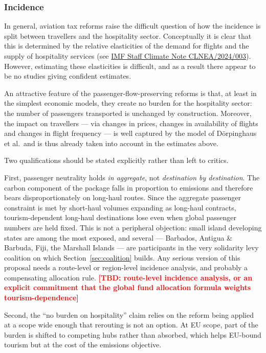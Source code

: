 \documentclass[11pt]{article}
\newcommand{\tbd}[1]{\textcolor{red}{\textbf{[TBD: #1]}}}
\begin{document}
\subsubsection{Incidence}
\label{subsec:incidence}

In general, aviation tax reforms raise the difficult question of how the
incidence is split between travellers and the hospitality sector.
Conceptually it is clear that this is determined by the relative elasticities of
the demand for flights and the supply of hospitality services (see
\href{https://meetings.imf.org/en/-/media/files/publications/staff-climate-notes/2024/english/clnea2024003.pdf}{IMF
Staff Climate Note CLNEA/2024/003}). However, estimating these elasticities is
difficult, and as a result there appear to be no studies giving confident
estimates.

An attractive feature of the passenger-flow-preserving reforms is that, at least
in the simplest economic models, they create no burden for the hospitality
sector: the number of passengers transported is unchanged by construction.
Moreover, the impact on travellers --- via changes in prices, changes in
availability of flights and changes in flight frequency --- is well captured by
the model of Dörpinghaus et al.\ and is thus already taken into account in the
estimates above.

Two qualifications should be stated explicitly rather than left to critics.

First, passenger neutrality holds \emph{in aggregate}, not
\emph{destination by destination}. The carbon component of the package falls in
proportion to emissions and therefore bears disproportionately on long-haul
routes. Since the aggregate passenger constraint is met by short-haul volumes
expanding as long-haul contracts, tourism-dependent long-haul destinations lose
even when global passenger numbers are held fixed. This is not a peripheral
objection: small island developing states are among the most exposed, and
several --- Barbados, Antigua \& Barbuda, Fiji, the Marshall Islands --- are
participants in the very solidarity levy coalition on which
Section~\ref{sec:coalition} builds. Any serious version of this proposal needs a
route-level or region-level incidence analysis, and probably a compensating
allocation rule. \tbd{route-level incidence analysis, or an explicit commitment
that the global fund allocation formula weights tourism-dependence}

Second, the ``no burden on hospitality'' claim relies on the reform being
applied at a scope wide enough that rerouting is not an option. At EU scope,
part of the burden is shifted to competing hubs rather than absorbed, which
helps EU-bound tourism but at the cost of the emissions objective.
\end{document}
